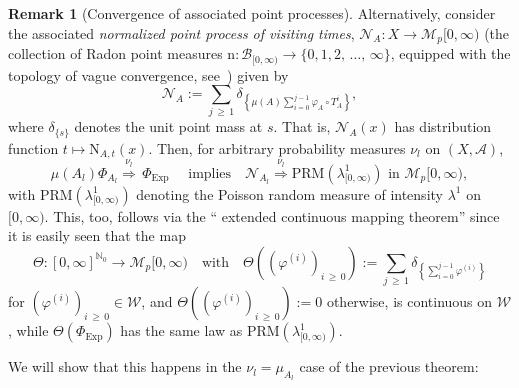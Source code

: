 \documentclass[10pt]{amsart}
\theoremstyle{definition}\newtheorem{defi}[theo]{Definition}\newtheorem{rema}[theo]{Remark}\newtheorem{exam}[theo]{Example}\newtheorem{exem}[theo]{Example}\newtheorem{nota}[theo]{Notation}
\newcommand{\clA}{\mathcal{A}}
\newcommand{\clB}{\mathcal{B}}
\newcommand{\clM}{\mathcal{M}}
\newcommand{\clW}{\mathcal{W}}
\newcommand{\clN}{\mathcal{N}}
\newcommand{\Expl}{\mathrm{Exp}}
\newcommand{\rmN}{\mathrm{N}}
\newcommand{\PRM}{\mathrm{PRM}}
\newcommand{\rmnn}{\mathrm{n}}
\newcommand{\bbN}{\mathbb{N}}
\begin{document}
\begin{rema}[{Convergence of associated point processes}]\label{R_CgePoint1}
Alternatively, consider the associated \emph{normalized point process of visiting times}, $\clN_{A}:X\rightarrow\clM_{p}[0,\infty)$ (the collection of Radon point measures $\rmnn:\clB_{[0,\infty)}\rightarrow\{0,1,2,\,\ldots,\,\infty\}$, equipped with the topology of vague convergence, see~\cite[Chapter~3]{Resnick}) given by
\begin{equation}
\clN_{A}:= {\sum_{j\,\geq\,1}}
\delta_{\left\{\mu(A)\sum\limits_{i=0}^{j-1}\varphi_{A}\circ T_{A}^{i}\right\}},
\end{equation}
where $\delta_{\{s\}}$ denotes the unit point mass at $s$. That is, $\clN_{A}(x)$ has distribution function $t\mapsto\rmN_{A,t}(x)$. Then, for arbitrary probability measures $\nu_{l}$ on $(X,\clA)$,
\begin{equation}
\mu(A_{l})\Phi_{A_{l}}\overset{\nu_{l}}{\Longrightarrow}\,\Phi_{\Expl }\quad\text{ implies} \quad\clN_{A_{l}}\overset{\nu_{l}} {\Longrightarrow}\PRM\left(\lambda_{\lbrack0,\infty)}^{1}\right)\text{ in }\clM_{p}[0,\infty),
\end{equation}
with $\PRM(\lambda_{\lbrack0,\infty)}^{1})$ denoting the Poisson random measure of intensity $\lambda^{1}$ on $[0,\infty)$. This, too, follows via the `` extended continuous mapping theorem'' since it is easily seen that the map 
\[
\Theta :[0,\infty]^{\bbN_{0}}\rightarrow\clM_{p}[0,\infty)\quad\text{with}\quad\Theta\left(\left(\varphi^{(i)}\right)_{i\,\geq\,0}\right):= {\sum_{j\,\geq\,1}}
\delta_{\left\{\sum\limits_{i=0}^{j-1}\varphi^{(i)}\right\}}
\]
for $(\varphi^{(i)})_{i\,\geq\,0}
\in\clW$, and $\Theta((\varphi^{(i)})_{i\,\geq\,0}):=0$ otherwise, is continuous on $\clW$, while $\Theta(\Phi_{\Expl})$ has the same law as $\PRM(\lambda_{\lbrack0,\infty)}^{1})$.
\end{rema}

We will show that this happens in the $\nu_{l}=\mu_{A_{l}}$ case of the previous theorem:
\end{document}
